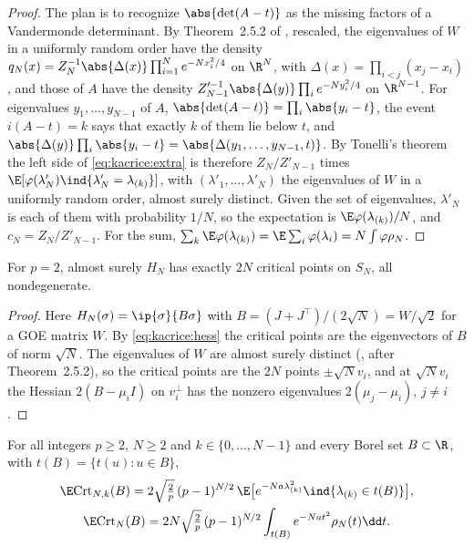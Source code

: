 \begin{refsection}
\begin{proof}
The plan is to recognize $\abs{\det(A-t)}$ as the missing factors of a Vandermonde determinant. By Theorem~2.5.2 of \textcite{AndersonGuionnetZeitouni2010}, rescaled, the eigenvalues of $W$ in a uniformly random order have the density $q_N(x)=Z_N^{-1}\abs{\Delta(x)}\prod_{i=1}^Ne^{-Nx_i^2/4}$ on $\R^N$, with $\Delta(x)=\prod_{i<j}(x_j-x_i)$, and those of $A$ have the density $Z'^{-1}_{N-1}\abs{\Delta(y)}\prod_ie^{-Ny_i^2/4}$ on $\R^{N-1}$. For eigenvalues $y_1,\dots,y_{N-1}$ of $A$, $\abs{\det(A-t)}=\prod_i\abs{y_i-t}$, the event $i(A-t)=k$ says that exactly $k$ of them lie below $t$, and $\abs{\Delta(y)}\prod_i\abs{y_i-t}=\abs{\Delta(y_1,\dots,y_{N-1},t)}$. By Tonelli's theorem the left side of \eqref{eq:kacrice:extra} is therefore $Z_N/Z'_{N-1}$ times $\E[\varphi(\lambda'_N)\ind\{\lambda'_N=\lambda_{(k)}\}]$, with $(\lambda'_1,\dots,\lambda'_N)$ the eigenvalues of $W$ in a uniformly random order, almost surely distinct. Given the set of eigenvalues, $\lambda'_N$ is each of them with probability $1/N$, so the expectation is $\E\varphi(\lambda_{(k)})/N$, and $c_N=Z_N/Z'_{N-1}$. For the sum, $\sum_k\E\varphi(\lambda_{(k)})=\E\sum_i\varphi(\lambda_i)=N\int\varphi\rho_N$.
\end{proof}

\begin{lemma}\label{lem:kacrice:two}
For $p=2$, almost surely $H_N$ has exactly $2N$ critical points on $S_N$, all nondegenerate.
\end{lemma}

\begin{proof}
Here $H_N(\sigma)=\ip{\sigma}{B\sigma}$ with $B=(J+J^\top)/(2\sqrt N)=W/\sqrt2$ for a GOE matrix $W$. By \eqref{eq:kacrice:hess} the critical points are the eigenvectors of $B$ of norm $\sqrt N$. The eigenvalues of $W$ are almost surely distinct (\textcite{AndersonGuionnetZeitouni2010}, after Theorem~2.5.2), so the critical points are the $2N$ points $\pm\sqrt Nv_i$, and at $\sqrt Nv_i$ the Hessian $2(B-\mu_iI)$ on $v_i^\perp$ has the nonzero eigenvalues $2(\mu_j-\mu_i)$, $j\ne i$.
\end{proof}

\begin{theorem}\label{thm:kacrice:exact}
For all integers $p\ge2$, $N\ge2$ and $k\in\{0,\dots,N-1\}$ and every Borel set $B\subset\R$, with $t(B)=\{t(u):u\in B\}$,
\begin{gather}
\E\kacriceCrt_{N,k}(B)=2\sqrt{\tfrac2p}\,(p-1)^{N/2}\,\E\bigl[e^{-Na\lambda_{(k)}^2}\ind\{\lambda_{(k)}\in t(B)\}\bigr],\label{eq:kacrice:exact}\\
\E\kacriceCrt_N(B)=2N\sqrt{\tfrac2p}\,(p-1)^{N/2}\int_{t(B)}e^{-Nat^2}\rho_N(t)\dd t.\notag
\end{gather}
\end{theorem}


\end{refsection}
